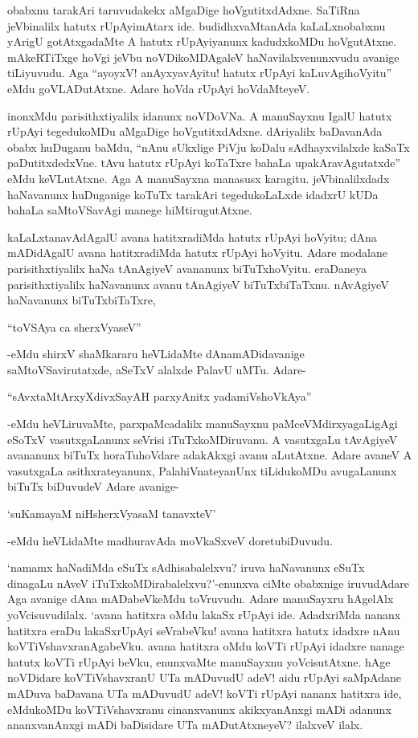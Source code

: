 obabxnu tarakAri taruvudakekx aMgaDige hoVgutitxdAdxne. SaTiRna jeVbinalilx hatutx rUpAyimAtarx ide. budidhxvaMtanAda kaLaLxnobabxnu yArigU gotAtxgadaMte A hatutx rUpAyiyanunx kadudxkoMDu hoVgutAtxne. mAkeRTiTxge hoVgi jeVbu noVDikoMDAgaleV haNavilalxvenunxvudu avanige tiLiyuvudu. Aga ``ayoyxV! anAyxyavAyitu! hatutx rUpAyi kaLuvAgihoVyitu'' eMdu goVLADutAtxne. Adare hoVda rUpAyi hoVdaMteyeV.

inonxMdu parisithxtiyalilx idanunx noVDoVNa. A manuSayxnu IgalU hatutx rUpAyi tegedukoMDu aMgaDige hoVgutitxdAdxne. dAriyalilx baDavanAda obabx huDuganu baMdu, ``nAnu sUkxlige PiVju koDalu sAdhayxvilalxde kaSaTx paDutitxdedxVne. tAvu hatutx rUpAyi koTaTxre bahaLa upakAravAgutatxde'' eMdu keVLutAtxne. Aga A manuSayxna manasusx karagitu. jeVbinalilxdadx haNavanunx huDuganige koTuTx tarakAri tegedukoLaLxde idadxrU kUDa bahaLa saMtoVSavAgi manege hiMtirugutAtxne.

kaLaLxtanavAdAgalU avana hatitxradiMda hatutx rUpAyi hoVyitu; dAna mADidAgalU avana hatitxradiMda hatutx rUpAyi hoVyitu. Adare modalane parisithxtiyalilx haNa tAnAgiyeV avananunx biTuTxhoVyitu. eraDaneya parisithxtiyalilx haNavanunx avanu tAnAgiyeV biTuTxbiTaTxnu. nAvAgiyeV haNavanunx biTuTxbiTaTxre,

\begin{shloka}
``toVSAya ca sherxVyaseV''
\end{shloka}

-eMdu shirxV shaMkararu heVLidaMte dAnamADidavanige saMtoVSavirutatxde, aSeTxV alalxde PalavU uMTu. Adare-

\begin{shloka}
``sAvxtaMtArxyXdivxSayAH parxyAnitx yadamiVshoVkAya''
\end{shloka}

-eMdu heVLiruvaMte, parxpaMcadalilx manuSayxnu paMceVMdirxyagaLigAgi eSoTxV vasutxgaLanunx seVrisi iTuTxkoMDiruvanu. A vasutxgaLu tAvAgiyeV avananunx biTuTx horaTuhoVdare adakAkxgi avanu aLutAtxne. Adare avaneV A vasutxgaLa asithxrateyanunx, PalahiVnateyanUnx tiLidukoMDu avugaLanunx biTuTx biDuvudeV Adare avanige-

\begin{shloka}
`suKamayaM niHsherxVyasaM tanavxteV'
\end{shloka}

-eMdu heVLidaMte madhuravAda moVkaSxveV doretubiDuvudu.

`namamx haNadiMda eSuTx sAdhisabalelxvu? iruva haNavanunx eSuTx dinagaLu nAveV iTuTxkoMDirabalelxvu?'-enunxva ciMte obabxnige iruvudAdare Aga avanige dAna mADabeVkeMdu toVruvudu. Adare manuSayxru hAgelAlx yoVcisuvudilalx. `avana hatitxra oMdu lakaSx rUpAyi ide. AdadxriMda nananx hatitxra eraDu lakaSxrUpAyi seVrabeVku! avana hatitxra hatutx idadxre nAnu koVTiVshavxranAgabeVku. avana hatitxra oMdu koVTi rUpAyi idadxre nanage hatutx koVTi rUpAyi beVku, enunxvaMte manuSayxnu yoVcisutAtxne. hAge noVDidare koVTiVshavxranU UTa mADuvudU adeV! aidu rUpAyi saMpAdane mADuva baDavana UTa mADuvudU adeV! koVTi rUpAyi nananx hatitxra ide, eMdukoMDu koVTiVshavxranu cinanxvanunx akikxyanAnxgi mADi adanunx ananxvanAnxgi mADi baDisidare UTa mADutAtxneyeV? ilalxveV ilalx.

